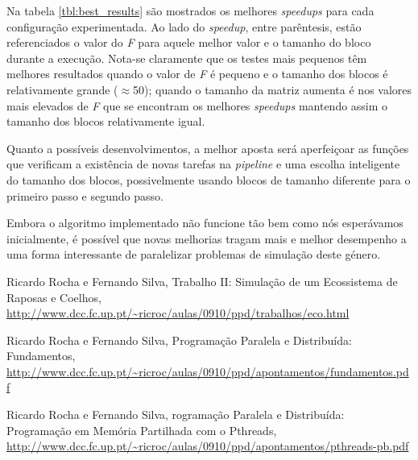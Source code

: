 \documentclass[12pt]{article}
\begin{document}
Na tabela \ref{tbl:best_results} são mostrados os melhores \textit{speedups} para cada configuração experimentada.
Ao lado do \textit{speedup}, entre parêntesis, estão referenciados o valor do \textit{F} para aquele melhor valor
e o tamanho do bloco durante a execução. Nota-se claramente que os testes mais pequenos têm melhores resultados
quando o valor de \textit{F} é pequeno e o tamanho dos blocos é relativamente grande ($\approx$50);
quando o tamanho da matriz aumenta é nos valores mais elevados de \textit{F} que se encontram os melhores
\textit{speedups} mantendo assim o tamanho dos blocos relativamente igual.

Quanto a possíveis desenvolvimentos, a melhor aposta será aperfeiçoar as funções que verificam
a existência de novas tarefas na \textit{pipeline} e uma escolha inteligente do tamanho dos blocos, possivelmente
usando blocos de tamanho diferente para o primeiro passo e segundo passo.

Embora o algoritmo implementado não funcione tão bem como nós esperávamos inicialmente, é possível que
novas melhorias tragam mais e melhor desempenho a uma forma interessante de paralelizar problemas de simulação
deste género.

\renewcommand{\bibname}{Referências}
\begin{thebibliography}{10}
  
	 Ricardo Rocha e Fernando Silva, Trabalho II: Simulação de um Ecossistema de Raposas e Coelhos, \url{http://www.dcc.fc.up.pt/~ricroc/aulas/0910/ppd/trabalhos/eco.html}
	
	 Ricardo Rocha e Fernando Silva, Programação Paralela e Distribuída: Fundamentos,
	\url{http://www.dcc.fc.up.pt/~ricroc/aulas/0910/ppd/apontamentos/fundamentos.pdf}
	
	 Ricardo Rocha e Fernando Silva, rogramação Paralela e Distribuída: Programação em Memória Partilhada com o Pthreads, \url{http://www.dcc.fc.up.pt/~ricroc/aulas/0910/ppd/apontamentos/pthreads-pb.pdf}
	
\end{thebibliography}


\end{document}
